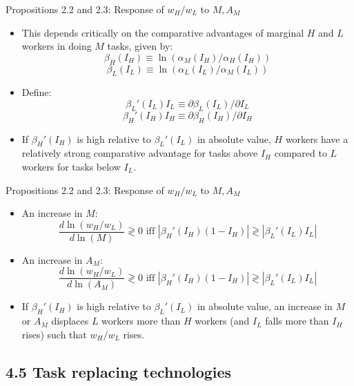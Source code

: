 \documentclass[notes=show]{beamer}
\begin{document}
\begin{frame}{Propositions 2.2 and 2.3: Response of $w_{H}/w_{L}$ to $M,A_{M}$}
\begin{itemize}
\item This depends critically on the comparative advantages of marginal $H$ and $L$ workers in doing $M$ tasks, given by:
\[
\beta_{H}(I_{H}) \equiv \ln ( \alpha_{M}(I_{H}) / \alpha_{H}(I_{H}))
\]
\[
\beta_{L}(I_{L}) \equiv \ln ( \alpha_{L}(I_{L}) / \alpha_{M}(I_{L}))
\]
\item Define:
\[
\beta_{L}'(I_{L}) I_{L} \equiv \partial \beta_{L}(I_{L})/ \partial I_{L}  
\]
\[
\beta_{H}'(I_{H}) I_{H} \equiv \partial \beta_{H}(I_{H})/ \partial I_{H}  
\]
\item If $ \beta_{H}'(I_{H})$ is high relative to $\beta_{L}'(I_{L})$ in absolute value, $H$ workers have a relatively strong comparative advantage for tasks above $I_{H}$ compared to $L$ workers for tasks below $I_{L}$.
\end{itemize}
\end{frame}

\begin{frame}{Propositions 2.2 and 2.3: Response of $w_{H}/w_{L}$ to $M,A_{M}$}
\begin{itemize}
\item An increase in $M$: 
\[
\frac{d \ln (w_{H}/w_{L})}{d \ln (M)} \gtrless 0 \text{ iff } | \beta_{H}'(I_{H}) (1 - I_{H})| \gtrless |\beta_{L}'(I_{L}) I_{L}|
\]
\item An increase in $A_{M}$:
\[
\frac{d \ln (w_{H}/w_{L})}{d \ln (A_{M})} \gtrless 0 \text{ iff } | \beta_{H}'(I_{H}) (1 - I_{H})| \gtrless |\beta_{L}'(I_{L}) I_{L}|
\]
\item If $ \beta_{H}'(I_{H})$ is high relative to $\beta_{L}'(I_{L})$ in absolute value, an increase in $M$ or $A_{M}$ displaces $L$ workers more than $H$ workers (and $I_{L}$ falls more than $I_{H}$ rises) such that $w_{H}/w_{L}$ rises.
\end{itemize}
\end{frame}

\subsection{4.5 Task replacing technologies}
\end{document}
